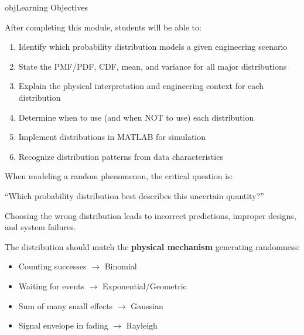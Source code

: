 \begin{PSbox}[unbreakable]{obj}{Learning Objectives}

After completing this module, students will be able to:

\begin{enumerate}
\def\labelenumi{\arabic{enumi}.}
\tightlist
\item
  Identify which probability distribution models a given engineering scenario
\item
  State the PMF/PDF, CDF, mean, and variance for all major distributions
\item
  Explain the physical interpretation and engineering context for each distribution
\item
  Determine when to use (and when NOT to use) each distribution
\item
  Implement distributions in MATLAB for simulation
\item
  Recognize distribution patterns from data characteristics
\end{enumerate}

\end{PSbox}



When modeling a random phenomenon, the critical question is:

\begin{PSquote}

``Which probability distribution best describes this uncertain quantity?''

\end{PSquote}

Choosing the wrong distribution leads to incorrect predictions, improper designs, and system failures.


The distribution should match the \textbf{physical mechanism} generating randomness:

\begin{itemize}
\tightlist
\item
  Counting successes \ensuremath{\to} Binomial
\item
  Waiting for events \ensuremath{\to} Exponential/Geometric
\item
  Sum of many small effects \ensuremath{\to} Gaussian
\item
  Signal envelope in fading \ensuremath{\to} Rayleigh
\end{itemize}

